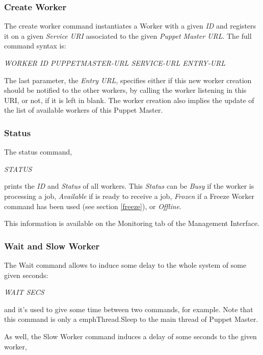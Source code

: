 \documentclass[times, 10pt,twocolumn]{article}
\begin{document}
            \subsubsection{Create Worker}
            The create worker command instantiates a Worker with a given \emph{ID} and registers it on a given \emph{Service URI} associated to the given \emph{Puppet Master URL}. The full command syntax is: 
            
            \emph{WORKER ID PUPPETMASTER-URL SERVICE-URL ENTRY-URL} 
            
            The last parameter, the \emph{Entry URL}, specifies either if this new worker creation should be notified to the other workers, by calling the worker listening in this URI, or not, if it is left in blank.
            The worker creation also implies the update of the list of available workers of this Puppet Master.
            \subsubsection{Status}
            
            The status command,  
            
            \emph{STATUS}
            
            prints the \emph{ID} and \emph{Status} of all workers. This \emph{Status} can be  \emph{Busy} if the worker is processing a job, \emph{Available} if is ready to receive a job, \emph{Frozen} if a Freeze Worker command has been used (see section \ref{freeze}), or \emph{Offline}.
            
            This information is available on the Monitoring tab of the Management Interface. 
                   	
            \subsubsection{Wait and Slow Worker}
			The Wait command allows to induce some delay to the whole system of some given seconds:
            
            \emph{WAIT SECS}
            
            and it's used to give some time between two commands, for example. Note that this command is only a emph{Thread.Sleep} to the main thread of Puppet Master. 
            
            As well, the Slow Worker command induces a delay of some seconds to the given worker, 
            
\end{document}
